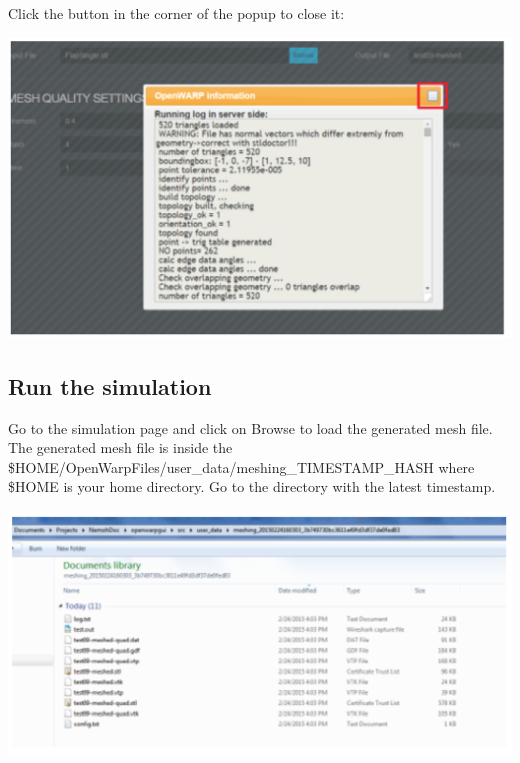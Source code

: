 \documentclass[12pt]{article}
\begin{document}


Click the button in the corner of the popup to close it:

\vspace{\abovedisplayskip}
\begin{minipage}{\linewidth}
	\centering
	\includegraphics[scale=0.5]{img/46}
\end{minipage}
\vspace{\belowdisplayskip}

\subsection{Run the simulation}

Go to the simulation page and click on Browse to load the generated mesh file.
The generated mesh file is inside the \$HOME/OpenWarpFiles/user{\_}data/meshing_TIMESTAMP_HASH where
\$HOME is your home directory. Go to the directory with the latest timestamp.

\vspace{\abovedisplayskip}
\begin{minipage}{\linewidth}
	\centering
	\includegraphics[scale=0.5]{img/47}
\end{minipage}
\vspace{\belowdisplayskip}
\end{document}
